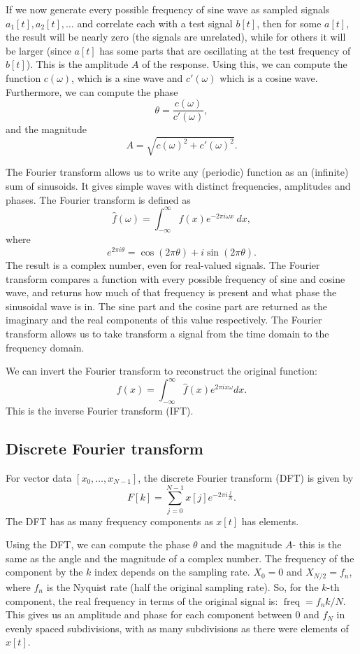 \documentclass[a4paper, openany]{memoir}
\begin{document}
If we now generate every possible frequency of sine wave as sampled signals $a_1[t], a_2[t], \dots$ and correlate each with a test signal $b[t]$, then for some $a[t]$, the result will be nearly zero (the signals are unrelated), while for others it will be larger (since $a[t]$ has some parts that are oscillating at the test frequency of $b[t]$). This is the amplitude $A$ of the response. Using this, we can compute the function $c(\omega)$, which is a sine wave and $c'(\omega)$ which is a cosine wave. Furthermore, we can compute the phase
\[\theta = \frac{c(\omega)}{c'(\omega)},\]
and the magnitude
\[A = \sqrt{c(\omega)^2 + c'(\omega)^2}.\]

The Fourier transform allows us to write any (periodic) function as an (infinite) sum of sinusoids. It gives simple waves with distinct frequencies, amplitudes and phases. The Fourier transform is defined as
\[\hat{f}(\omega) = \int_{-\infty}^{\infty} f(x) e^{-2\pi i \omega x} \ dx,\]
where
\[e^{2\pi i \theta} = \cos (2\pi \theta) + i \sin (2\pi \theta).\]
The result is a complex number, even for real-valued signals. The Fourier transform compares a function with every possible frequency of sine and cosine wave, and returns how much of that frequency is present and what phase the sinusoidal wave is in. The sine part and the cosine part are returned as the imaginary and the real components of this value respectively. The Fourier transform allows us to take transform a signal from the time domain to the frequency domain.

We can invert the Fourier transform to reconstruct the original function:
\[f(x) = \int_{-\infty}^{\infty} \hat{f}(x) e^{2\pi i x \omega} dx.\]
This is the inverse Fourier transform (IFT).

\subsection{Discrete Fourier transform}
For vector data $[x_0, \dots, x_{N-1}]$, the discrete Fourier transform (DFT) is given by
\[F[k] = \sum_{j=0}^{N-1} x[j] e^{-2\pi i \frac{j}{N}}.\]
The DFT has as many frequency components as $x[t]$ has elements.

Using the DFT, we can compute the phase $\theta$ and the magnitude $A$- this is the same as the angle and the magnitude of a complex number. The frequency of the component by the $k$ index depends on the sampling rate. $X_0 = 0$ and $X_{N/2} = f_n$, where $f_n$ is the Nyquist rate (half the original sampling rate). So, for the $k$-th component, the real frequency in terms of the original signal is: $\operatorname{freq} = f_n k/N$. This gives us an amplitude and phase for each component between 0 and $f_N$ in evenly spaced subdivisions, with as many subdivisions as there were elements of $x[t]$.
\end{document}
